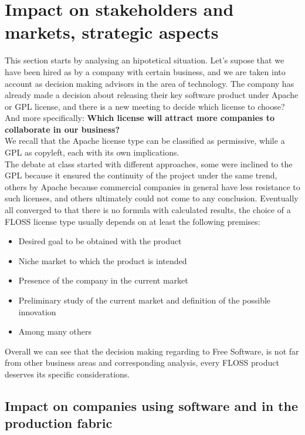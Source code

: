 \chapter{Impact on stakeholders and markets, strategic aspects}

This section starts by analysing an hipotetical situation. Let's supose that we have been hired as by a company with certain business, and we are taken into account as decision making advisors in the area of technology. The company has already made a decision about releasing their key software product under Apache or GPL license, and there is a new meeting to decide which license to choose? And more specifically: \textbf{Which license will attract more companies to collaborate in our business?}\\

We recall that the Apache license type can be classified as permissive, while a GPL as copyleft, each with its own implications. \\

The debate at class started with different approaches, some were inclined to the GPL because it ensured the continuity of the project under the same trend, others by Apache because commercial companies in general have less resistance to such licenses, and others ultimately could not come to any conclusion. Eventually all converged to that there is no formula with calculated results, the choice of a FLOSS license type usually depends on at least the following premises:

\begin{itemize}
\item Desired goal to be obtained with the product
\item Niche market to which the product is intended
\item Presence of the company in the current market
\item Preliminary study of the current market and definition of the possible innovation
\item Among many others
\end{itemize}

Overall we can see that the decision making regarding to Free Software, is not far from other business areas and corresponding analysis, every FLOSS product deserves its specific considerations.

\section{Impact on companies using software and in the production fabric}


